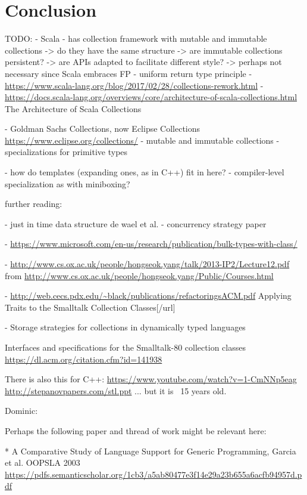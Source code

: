 \documentclass[sigconf, 10pt, review]{acmart}
\begin{document}
\section{Conclusion}

\begin{note}
TODO:
- Scala
  - has collection framework with mutable and immutable collections
    -> do they have the same structure 
    -> are immutable collections persistent?
    -> are APIs adapted to facilitate different style?
      -> perhaps not necessary since Scala embraces FP
  - uniform return type principle
  - \url{https://www.scala-lang.org/blog/2017/02/28/collections-rework.html}
 - \url{https://docs.scala-lang.org/overviews/core/architecture-of-scala-collections.html} 
   The Architecture of Scala Collections  

- Goldman Sachs Collections, now Eclipse Collections
\url{https://www.eclipse.org/collections/}
 - mutable and immutable collections
 - specializations for primitive types

- how do templates (expanding ones, as in C++) fit in here?
- compiler-level specialization as with miniboxing?

further reading:

- just in time data structure de wael et al.
- concurrency strategy paper

 - \url{https://www.microsoft.com/en-us/research/publication/bulk-types-with-class/}

 - \url{http://www.cs.ox.ac.uk/people/hongseok.yang/talk/2013-IP2/Lecture12.pdf}
   from \url{http://www.cs.ox.ac.uk/people/hongseok.yang/Public/Courses.html}
 
 - \url{http://web.cecs.pdx.edu/~black/publications/refactoringsACM.pdf}
   Applying Traits to the Smalltalk Collection Classes[/url]
 
 - Storage strategies for collections in dynamically typed languages \citep{Bolz:2013:SSC}

Interfaces and specifications for the Smalltalk-80 collection classes
\url{https://dl.acm.org/citation.cfm?id=141938}


There is also this for C++:
 \url{https://www.youtube.com/watch?v=1-CmNNp5eag}
 \url{http://stepanovpapers.com/stl.ppt}
... but it is ~15 years old.



Dominic:

Perhaps the following paper and thread of work might be relevant here:

* A Comparative Study of Language Support for Generic Programming, Garcia et al. OOPSLA 2003
\url{https://pdfs.semanticscholar.org/1cb3/a5ab80477e3f14e29a23b655a6acfb94957d.pdf}


\end{note}
\end{document}
